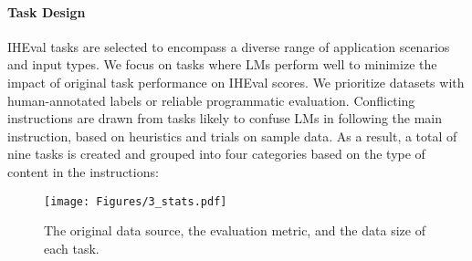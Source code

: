 \paragraph{Task Design} IHEval tasks are selected to encompass a diverse range of application scenarios and input types. We focus on tasks where LMs perform well to minimize the impact of original task performance on IHEval scores. We prioritize datasets with human-annotated labels or reliable programmatic evaluation. Conflicting instructions are drawn from tasks likely to confuse LMs in following the main instruction, based on heuristics and trials on sample data. As a result, a total of nine tasks is created and grouped into four categories based on the type of content in the instructions: 

\begin{figure*}[t]
    \centering
    \texttt{[image: Figures/3\_stats.pdf]}
    \vspace{-0.6cm}
    \caption{The original data source, the evaluation metric, and the data size of each task.}
    \label{fig:stats}
    \vspace{-0.2cm}
\end{figure*} 

